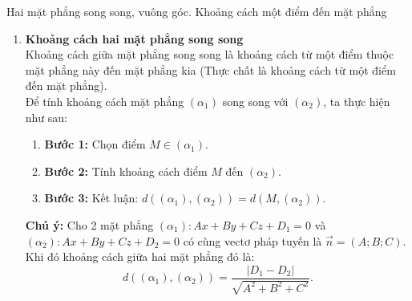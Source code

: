 \begin{dang}{Hai mặt phẳng song song, vuông góc. Khoảng cách một điểm đến mặt phẳng}
\begin{enumerate}[label=\bf\arabic*.]
	\begin{note}
		\textbf{Chú ý:}
		\begin{itemize}
		\item Mặt phẳng $(O x y)$ có phương trình: $z=0$.
		\item Mặt phẳng $(O x z)$ có phương trình: $y=0$.
		\item Mặt phẳng $(O y z)$ có phương trình: $x=0$.
		\end{itemize}
	\end{note}
	\item \textbf{Khoảng cách hai mặt phẳng song song}\\
	Khoảng cách giữa mặt phẳng song song là khoảng cách từ một điểm thuộc mặt phẳng này đến mặt phẳng kia (Thực chất là khoảng cách từ một điểm đến mặt phẳng).\\
	Để tính khoảng cách mặt phẳng $\left(\alpha_1\right)$ song song với $\left(\alpha_2\right)$, ta thực hiện như sau:
	\begin{enumerate}
		\item[] \textbf{Bước 1:} Chọn điểm $M \in\left(\alpha_1\right)$.
		\item[] \textbf{Bước 2:} Tính khoảng cách điểm $M$ đến $\left(\alpha_2\right)$.
		\item[] \textbf{Bước 3:} Kết luận: $d\left(\left(\alpha_1\right),\left(\alpha_2\right)\right)=d\left(M,\left(\alpha_2\right)\right)$.
	\end{enumerate}
	\begin{note}
		\textbf{Chú ý:}
		Cho 2 mặt phẳng $\left(\alpha_1\right)\colon A x+B y+C z+D_1=0$ và $\left(\alpha_2\right)\colon A x+B y+C z+D_2=0$ có cùng vectơ pháp tuyến là $\overrightarrow{n}=(A; B; C)$. Khi đó khoảng cách giữa hai mặt phẳng đó là: $$d\left(\left(\alpha_1\right),(\alpha_2)\right)=\dfrac{\left|D_1-D_2\right|}{\sqrt{A^2+B^2+C^2}}.$$ 
	\end{note}
	\end{enumerate}
\end{dang}


